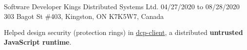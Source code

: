 \begin{cventries}

  \cventry
    {Software Developer} %
    {Kings Distributed Systems Ltd.} %
    {04/27/2020 to 08/28/2020} %
    {303 Bagot St \#403, Kingston, ON K7K5W7, Canada} %
    {
      \begin{cvitems} %
        \item{Helped design security (protection rings) in \href{https://www.npmjs.com/package/dcp-client}{dcp-client}, a distributed \textbf{untrusted JavaScript runtime}.}

\end{cvitems}}
\end{cventries}
